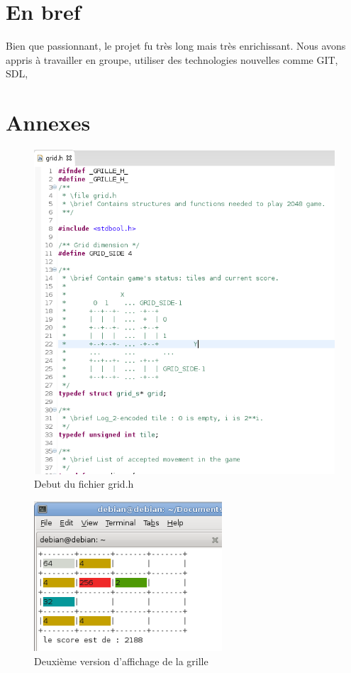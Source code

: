 \documentclass[12pt]{article}
\begin{document}
\newpage
\section{En bref}
Bien que passionnant, le projet fu tr\`es long mais tr\`es enrichissant. Nous
avons appris \`a travailler en groupe, utiliser des technologies nouvelles comme
GIT, SDL, 
\newpage



\newpage
\section{Annexes}
\listoffigures
\begin{figure}
   \caption{\label{grid_h} Debut du fichier grid.h}
   \includegraphics[scale=0.6]{grid_h.png}
\end{figure}

\begin{figure}
   \caption{\label{grille_couleur} Deuxi\`eme version d'affichage de la grille}
   \includegraphics[width=7cm]{grille_couleur.png}
\end{figure}
\end{document}
